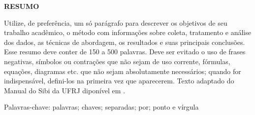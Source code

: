 \thispagestyle{empty}
\begin{center}
\textbf{\MakeUppercase{Resumo}}
\end{center}

\begin{spacing}{1.5}
Utilize, de preferência, um só parágrafo para descrever os objetivos de seu trabalho acadêmico, o método com informações sobre coleta, tratamento e análise dos dados, as técnicas de abordagem, os resultados e suas principais conclusões. Esse resumo deve conter de 150 a 500 palavras. Deve ser evitado o uso de frases negativas, símbolos ou contrações que não sejam de uso corrente, fórmulas, equações, diagramas etc. que não sejam absolutamente
necessários; quando for indispensável, defini-los na primeira vez que aparecerem. Texto adaptado do Manual do Sibi da UFRJ diponível em \cite{ManualSibi2023}.
\end{spacing}

\vspace{1em}

Palavras-chave: palavras; chaves; separadas; por; ponto e vírgula
\newpage